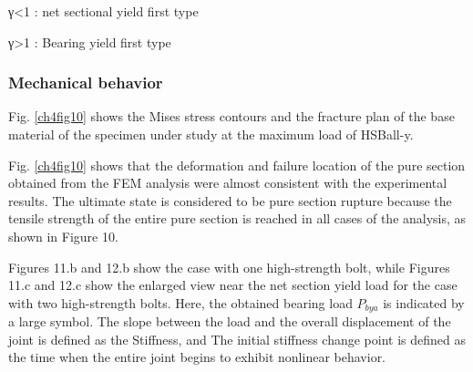 γ<1 : net sectional yield first type


γ>1 : Bearing yield first type %


\subsubsection{Mechanical behavior}

Fig. \ref{ch4fig10} shows the Mises stress contours and the fracture plan of the base material of the specimen under study at the maximum load of HSBall-y.

Fig. \ref{ch4fig10} shows that the deformation and failure location of the pure section obtained from the FEM analysis were almost consistent with the experimental results. The ultimate state is considered to be pure section rupture because the tensile strength of the entire pure section is reached in all cases of the analysis, as shown in Figure 10.


Figures 11.b and 12.b show the case with one high-strength bolt, while Figures 11.c and 12.c show the enlarged view near the net section yield load for the case with two high-strength bolts. Here, the obtained bearing load $P_{bya}$ is indicated by a large symbol. The slope between the load and the overall displacement of the joint is defined as the \ac{Stiffness}, and \ac{The initial stiffness change point} is defined as the time when the entire joint begins to exhibit nonlinear behavior.


